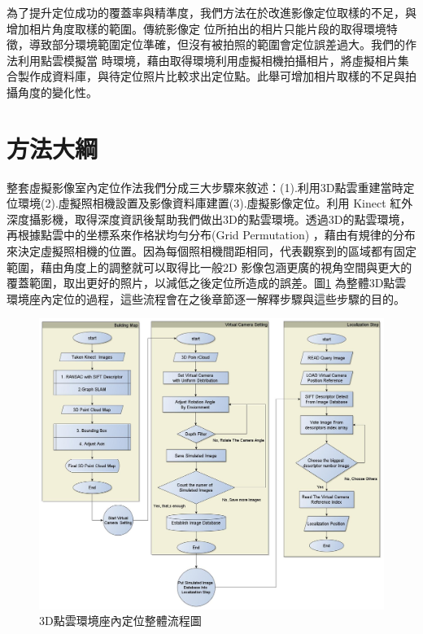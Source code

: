 
%

	為了提升定位成功的覆蓋率與精準度，我們方法在於改進影像定位取樣的不足，與增加相片角度取樣的範圍。傳統影像定
位所拍出的相片只能片段的取得環境特徵，導致部分環境範圍定位準確，但沒有被拍照的範圍會定位誤差過大。我們的作法利用點雲模擬當
時環境，藉由取得環境利用虛擬相機拍攝相片，將虛擬相片集合製作成資料庫，與待定位照片比較求出定位點。此舉可增加相片取樣的不足與拍
攝角度的變化性。

\section{方法大綱}
	整套虛擬影像室內定位作法我們分成三大步驟來敘述：(1).利用3D點雲重建當時定位環境(2).虛擬照相機設置及影像資料庫建置(3).虛擬影像定位。利用 
Kinect 紅外深度攝影機，取得深度資訊後幫助我們做出3D的點雲環境。透過3D的點雲環境，再根據點雲中的坐標系來作格狀均勻分布(Grid Permutation)
，藉由有規律的分布來決定虛擬照相機的位置。因為每個照相機間距相同，代表觀察到的區域都有固定範圍，藉由角度上的調整就可以取得比一般2D
影像包涵更廣的視角空間與更大的覆蓋範圍，取出更好的照片，以減低之後定位所造成的誤差。圖\ref{fig:Enire System Process}
為整體3D點雲環境座內定位的過程，這些流程會在之後章節逐一解釋步驟與這些步驟的目的。
 
 
  
\begin{figure}
\begin{center}

  \includegraphics[width=1.1\textwidth]{figures/Enire_System_Process.jpg}
  \caption{3D點雲環境座內定位整體流程圖}
  \label{fig:Enire System Process}
  
\end{center}
\end{figure}
  

